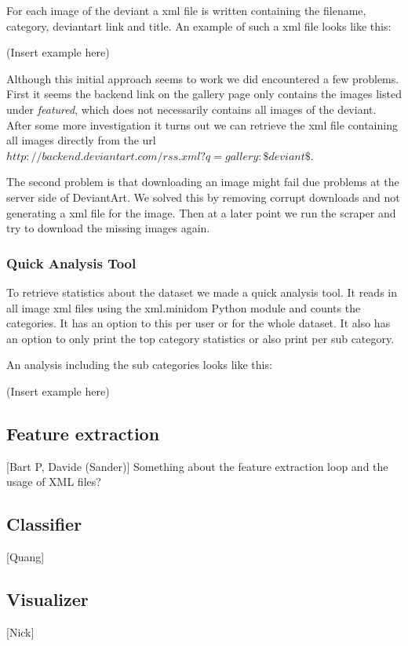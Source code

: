 For each image of the deviant a xml file is written containing the filename, category, deviantart link and title.
An example of such a xml file looks like this:

(Insert example here)

Although this initial approach seems to work we did encountered a few problems. First it
seems the backend link on the gallery page only contains the images listed under \textit{featured}, 
which does not necessarily contains all images of the deviant. After some more investigation it turns 
out we can retrieve the xml file containing all images directly from the url 
\textit{$http://backend.deviantart.com/rss.xml?q=gallery:\$deviant\$$}.

The second problem is that downloading an image might fail due problems at the server side of DeviantArt.
We solved this by removing corrupt downloads and not generating a xml file for the image. Then at a later
point we run the scraper and try to download the missing images again. 

\subsubsection{Quick Analysis Tool}
To retrieve statistics about the dataset we made a quick analysis tool. It reads in
all image xml files using the xml.minidom Python module  and counts the categories. 
It has an option to this per user or for the whole dataset. It also has an option
to only print the top category statistics or also print per sub category.

An analysis including the sub categories looks like this:

(Insert example here)

\subsection{Feature extraction}
[Bart P, Davide (Sander)]
Something about the feature extraction loop and the usage of XML files?
\subsection{Classifier}
[Quang]
\subsection{Visualizer}
[Nick]
